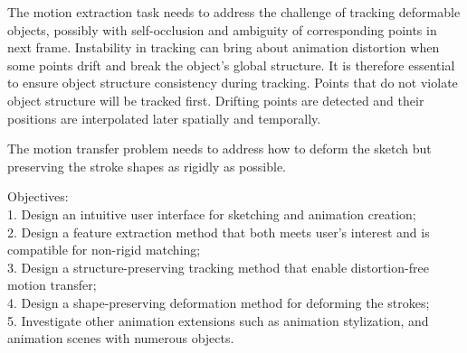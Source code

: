 The motion extraction task needs to address the challenge of tracking deformable objects,
possibly with self-occlusion and ambiguity of corresponding points in next frame.
Instability in tracking can bring about animation distortion when some points drift and break 
the object's global structure. It is therefore essential to ensure object structure consistency during tracking.
Points that do not violate object structure will be tracked first. Drifting points are detected and their 
positions are interpolated later spatially and temporally.


The motion transfer problem needs to address how to deform the sketch but preserving the stroke shapes as rigidly
as possible.


Objectives:\\
1. Design an intuitive user interface for sketching and animation creation;\\
2. Design a feature extraction method that both meets user’s interest and is compatible for non-rigid matching; \\
3. Design a structure-preserving tracking method that enable distortion-free motion transfer;\\
4. Design a shape-preserving deformation method for deforming the strokes;\\
5. Investigate other animation extensions such as animation stylization, and animation scenes with numerous objects.
